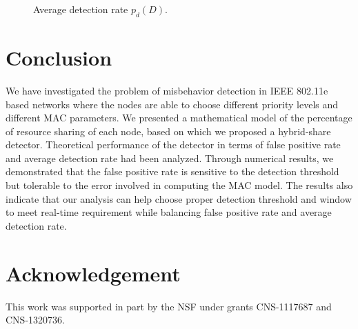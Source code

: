 \documentclass[conference]{IEEEtran}
\begin{document}
\begin{figure}[htbp]
\centering
\vspace{-1mm}
\caption{Average detection rate $p_d(D)$.}\label{fig:pd}
\vspace{-4mm}
\end{figure}


\section{Conclusion}\label{sec:conclusion}
We have investigated the problem of misbehavior detection in IEEE 802.11e based networks where the nodes are able to choose different priority levels and different MAC parameters. We presented a mathematical model of the percentage of resource sharing of each node, based on which we proposed a hybrid-share detector. Theoretical performance of the detector in terms of false positive rate and average detection rate had been analyzed. Through numerical results, we demonstrated that the false positive rate is sensitive to the detection threshold but tolerable to the error involved in computing the MAC model. The results also indicate that our analysis can help choose proper detection threshold and window to meet real-time requirement while balancing false positive rate and average detection rate.

\section*{Acknowledgement}
This work was supported in part by the NSF under grants CNS-1117687 and CNS-1320736.



\end{document}
